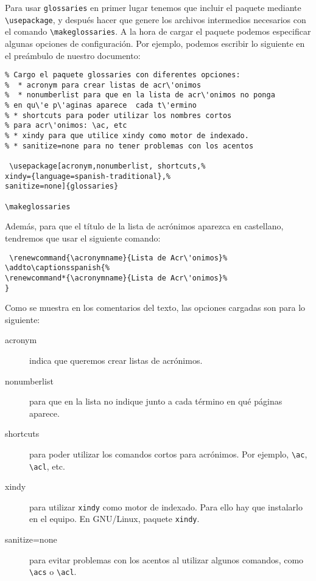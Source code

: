 \documentclass[11pt]{article}
\begin{document}
Para usar \texttt{glossaries} en primer lugar tenemos que incluir el paquete
mediante \verb+\usepackage+, y despu\'es hacer que genere los archivos
intermedios necesarios con el comando \verb+\makeglossaries+. A la hora de
cargar el paquete podemos especificar algunas opciones de configuraci\'on.
Por ejemplo, podemos escribir lo siguiente en el
pre\'ambulo de nuestro documento:

\begin{lstlisting}
% Cargo el paquete glossaries con diferentes opciones: 
%  * acronym para crear listas de acr\'onimos
%  * nonumberlist para que en la lista de acr\'onimos no ponga 
% en qu\'e p\'aginas aparece  cada t\'ermino
% * shortcuts para poder utilizar los nombres cortos 
% para acr\'onimos: \ac, etc
% * xindy para que utilice xindy como motor de indexado. 
% * sanitize=none para no tener problemas con los acentos

 \usepackage[acronym,nonumberlist, shortcuts,%
xindy={language=spanish-traditional},%
sanitize=none]{glossaries}

\makeglossaries
\end{lstlisting}

Adem\'as, para que el t\'itulo de la lista de acr\'onimos aparezca en
castellano, tendremos que usar el siguiente comando:

\begin{lstlisting}
 \renewcommand{\acronymname}{Lista de Acr\'onimos}%
\addto\captionsspanish{%
\renewcommand*{\acronymname}{Lista de Acr\'onimos}%
}
\end{lstlisting}


Como se muestra en los comentarios del texto, las opciones cargadas son para lo
siguiente:

\begin{description}
 \item [acronym] indica que queremos crear listas de acr\'onimos.
 \item [nonumberlist] para que en la lista no indique junto a cada t\'ermino en
qu\'e p\'aginas aparece.
\item [shortcuts] para poder utilizar los comandos cortos para acr\'onimos. Por
ejemplo, \verb+\ac+, \verb+\acl+, etc.
\item [xindy] para utilizar \texttt{xindy} como motor de indexado. Para ello
hay que instalarlo en el equipo. En GNU/Linux, paquete \texttt{xindy}.
\item [sanitize=none] para evitar problemas con  los acentos al utilizar
algunos comandos, como \verb+\acs+ o \verb+\acl+.
\end{description}
\end{document}
